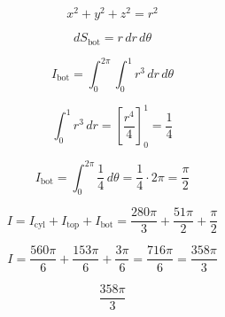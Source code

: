 \documentclass{report}
\begin{document}
{    \[
    x^2 + y^2 + z^2 = r^2
    \]

    \[
    dS_{\text{bot}} = r \, dr \, d\theta
    \]

    \[
    I_{\text{bot}} = \int_0^{2\pi} \int_0^1 r^3 \, dr \, d\theta
    \]

    \[
    \int_0^1 r^3 \, dr = \left[\frac{r^4}{4}\right]_0^1 = \frac{1}{4}
    \]

    \[
    I_{\text{bot}} = \int_0^{2\pi} \frac{1}{4} \, d\theta = \frac{1}{4} \cdot 2\pi = \frac{\pi}{2}
    \]

    \[
    I = I_{\text{cyl}} + I_{\text{top}} + I_{\text{bot}} = \frac{280\pi}{3} + \frac{51\pi}{2} + \frac{\pi}{2}
    \]

    \[
    I = \frac{560\pi}{6} + \frac{153\pi}{6} + \frac{3\pi}{6} = \frac{716\pi}{6} = \frac{358\pi}{3}
    \]

    \[
    \boxed{\frac{358\pi}{3}}
    \]

}

\end{document}
